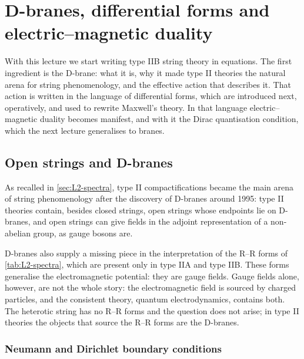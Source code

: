 \chapter{D-branes, differential forms and electric--magnetic duality}
\label{ch:L4}

With this lecture we start writing type IIB string theory in equations. The first ingredient is the D-brane: what it is, why it made type II theories the natural arena for string phenomenology, and the effective action that describes it. That action is written in the language of differential forms, which are introduced next, operatively, and used to rewrite Maxwell's theory. In that language electric--magnetic duality becomes manifest, and with it the Dirac quantisation condition, which the next lecture generalises to branes.

\section{Open strings and D-branes}
\label{sec:L4-dbranes}

As recalled in \cref{sec:L2-spectra}, type II compactifications became the main arena of string phenomenology after the discovery of D-branes around 1995: type II theories contain, besides closed strings, open strings whose endpoints lie on D-branes, and open strings can give fields in the adjoint representation of a non-abelian group, as gauge bosons are.

D-branes also supply a missing piece in the interpretation of the R--R forms of \cref{tab:L2-spectra}, which are present only in type IIA and type IIB. These forms generalise the electromagnetic potential: they are gauge fields. Gauge fields alone, however, are not the whole story: the electromagnetic field is sourced by charged particles, and the consistent theory, quantum electrodynamics, contains both. The heterotic string has no R--R forms and the question does not arise; in type II theories the objects that source the R--R forms are the D-branes.

\subsection{Neumann and Dirichlet boundary conditions}

